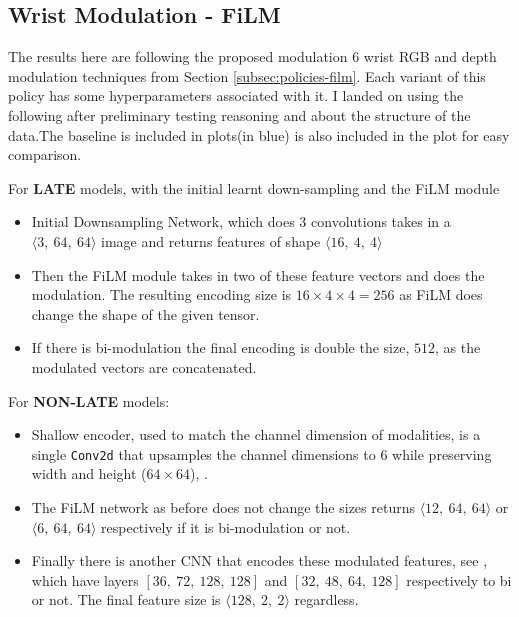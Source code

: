 \subsection{Wrist Modulation - FiLM}
The results here are following the proposed modulation 6 wrist RGB and depth modulation techniques from Section \ref{subsec:policies-film}. Each variant of this policy has some hyperparameters associated with it. I landed on using the following after preliminary testing reasoning and about the structure of the data.The baseline is included in plots(in blue) is also included in the plot for easy comparison. 

\noindent For \textbf{LATE} models, with the initial learnt down-sampling and the FiLM module
\begin{itemize}
  \itemsep0em
  \item Initial Downsampling Network, which does $3$ convolutions takes in a \(\langle 3, ~64, ~64 \rangle\) image and returns features of shape \(\langle 16, ~4, ~4 \rangle \)
  \item Then the FiLM module takes in two of these feature vectors and does the modulation. The resulting encoding size is \(16 \times 4 \times 4 = 256\) as FiLM does change the shape of the given tensor.
  \item If there is bi-modulation the final encoding is double the size, $512$, as the modulated vectors are concatenated.
\end{itemize}

\noindent For \textbf{NON-LATE} models:
\begin{itemize}
  \itemsep0em
  \item Shallow encoder, used to match the channel dimension of modalities, is a single \verb|Conv2d|  that upsamples the channel dimensions to $6$ while preserving width and height ($64 \times 64$), .
  \item The FiLM network as before does not change the sizes returns \(\langle 12, ~64, ~64 \rangle \) or \(\langle 6, ~64, ~64 \rangle \) respectively if it is bi-modulation or not.
  \item Finally there is another CNN that encodes these modulated features, see , which have layers $\left[36, ~72, ~128, ~128\right]$ and $\left[32, ~48, ~64, ~128\right]$ respectively to bi or not. The final feature size is \(\langle 128, ~2, ~2 \rangle\) regardless.
\end{itemize}



